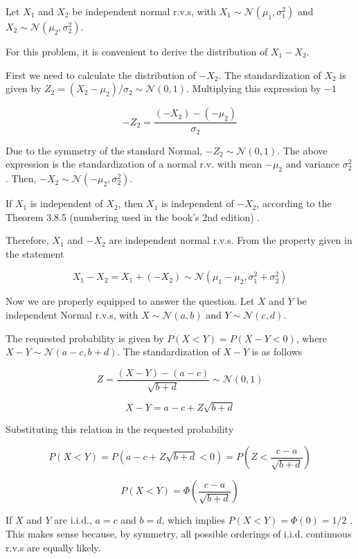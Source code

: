 Let $X_1$ and $X_2$ be independent normal r.v.s, with $X_1 \sim \mathcal{N}(\mu_1,\sigma_1^2)$ and $X_2 \sim \mathcal{N}(\mu_2,\sigma_2^2)$.

For this problem, it is convenient to derive the distribution of $X_1 - X_2$.

First we need to calculate the distribution of $-X_2$.
The standardization of $X_2$ is given by $Z_2 = (X_2 - \mu_2)/\sigma_2 \sim \mathcal{N}(0,1)$.
Multiplying this expression by $-1$

$$
-Z_2 = \frac{(-X_2) - (-\mu_2)}{\sigma_2}
$$

Due to the symmetry of the standard Normal, $-Z_2 \sim \mathcal{N}(0,1)$.
The above expression is the standardization of a normal r.v. with mean $-\mu_2$ and variance $\sigma_2^2$. Then, $-X_2 \sim \mathcal{N}(-\mu_2, \sigma_2^2)$.

If $X_1$ is independent of $X_2$, then $X_1$ is independent of $-X_2$, according to the Theorem 3.8.5 (numbering used in the book's 2nd edition) .


Therefore, $X_1$ and $-X_2$ are independent normal r.v.s. From the property given in the statement

$$
X_1 - X_2 = X_1 + (-X_2) \sim \mathcal{N}(\mu_1-\mu_2, \sigma_1^2+\sigma_2^2)
$$

Now we are properly equipped to answer the question.
Let $X$ and $Y$ be independent Normal r.v.s, with $X \sim \mathcal{N}(a,b)$ and $Y \sim \mathcal{N}(c,d)$.

The requested probability is given by $P(X < Y) = P(X - Y < 0)$, where $X-Y \sim \mathcal{N}(a-c, b+d)$.
The standardization of $X-Y$ is as follows

$$
Z = \frac{ (X-Y) - (a-c) }{\sqrt{b+d}} \sim \mathcal{N}(0,1)
$$

$$
X-Y = a-c + Z \sqrt{b+d}
$$

Substituting this relation in the requested probability

$$
P(X < Y) = P(a-c + Z \sqrt{b+d} < 0) = P \left( Z < \frac{c-a}{\sqrt{b+d}} \right)
$$

$$
P(X < Y) = \Phi \left( \frac{c-a}{\sqrt{b+d}} \right)
$$

If $X$ and $Y$ are i.i.d., $a=c$ and $b=d$, which implies $P(X < Y) = \Phi(0) = 1/2$ .
This makes sense because, by symmetry, all possible orderings of i.i.d. continuous r.v.s are equally likely.
